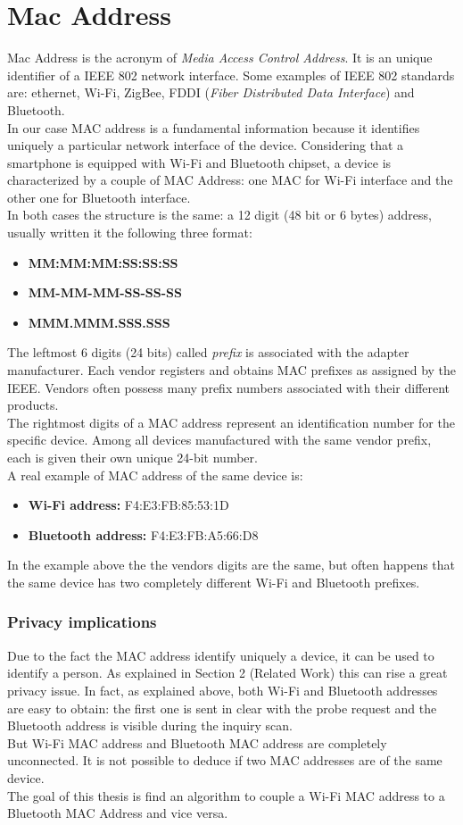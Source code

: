 \section{Mac Address}
Mac Address is the acronym of \textit{Media Access Control Address}. It is an unique identifier of a IEEE 802 network interface. Some examples of IEEE 802 standards are: ethernet, Wi-Fi, ZigBee, FDDI (\textit{Fiber Distributed Data Interface}) and Bluetooth. \\
In our case MAC address is a fundamental information because it identifies uniquely a particular network interface of the device. Considering that a smartphone is equipped with Wi-Fi and Bluetooth chipset, a device is characterized by a couple of MAC Address: one MAC for Wi-Fi interface and the other one for Bluetooth interface.\\
In both cases the structure is the same: a 12 digit (48 bit or 6 bytes) address, usually written it the following three format: 
\begin{itemize}
\item \textbf{MM:MM:MM:SS:SS:SS}
\item \textbf{MM-MM-MM-SS-SS-SS}
\item \textbf{MMM.MMM.SSS.SSS}
\end{itemize}
The leftmost 6 digits (24 bits) called \textit{prefix} is associated with the adapter manufacturer. Each vendor registers and obtains MAC prefixes as assigned by the IEEE. Vendors often possess many prefix numbers associated with their different products.\\
The rightmost digits of a MAC address represent an identification number for the specific device. Among all devices manufactured with the same vendor prefix, each is given their own unique 24-bit number.\\
\linebreak
A real example of MAC address of the same device is:
\begin{itemize}
\item \textbf{Wi-Fi address:} F4:E3:FB:85:53:1D
\item \textbf{Bluetooth address:} F4:E3:FB:A5:66:D8
\end{itemize}
In the example above the the vendors digits are the same, but often happens that the same device has two completely different Wi-Fi and Bluetooth prefixes.

\subsubsection{Privacy implications}
Due to the fact the MAC address identify uniquely a device, it can be used to identify a person. As explained in Section 2 (Related Work) this can rise a great privacy issue. In fact, as explained above, both Wi-Fi and Bluetooth addresses are easy to obtain: the first one is sent in clear with the probe request and the Bluetooth address is visible during the inquiry scan.\\
But Wi-Fi MAC address and Bluetooth MAC address are completely unconnected. It is not possible to deduce if two MAC addresses are of the same device.\\
The goal of this thesis is find an algorithm to couple a Wi-Fi MAC address to a Bluetooth MAC Address and vice versa.
